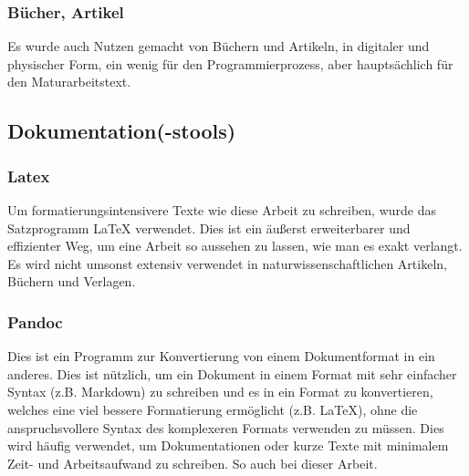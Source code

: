 \documentclass[a4paper,11pt]{article}
\begin{document}
\subsubsection{Bücher, Artikel}
Es wurde auch Nutzen gemacht von Büchern und Artikeln, in digitaler und physischer Form, ein wenig für den Programmierprozess, aber hauptsächlich für den Maturarbeitstext.

\subsection{Dokumentation(-stools)}
\subsubsection{Latex}
Um formatierungsintensivere Texte wie diese Arbeit zu schreiben, wurde das Satzprogramm LaTeX verwendet. Dies ist ein äußerst erweiterbarer und effizienter Weg, um eine Arbeit so aussehen zu lassen, wie man es exakt verlangt. Es wird nicht umsonst extensiv verwendet in naturwissenschaftlichen Artikeln, Büchern und Verlagen.
\subsubsection{Pandoc}
Dies ist ein Programm zur Konvertierung von einem Dokumentformat in ein anderes. Dies ist nützlich, um ein Dokument in einem Format mit sehr einfacher Syntax (z.B. Markdown) zu schreiben und es in ein Format zu konvertieren, welches eine viel bessere Formatierung ermöglicht (z.B. LaTeX), ohne die anspruchsvollere Syntax des komplexeren Formats verwenden zu müssen. Dies wird häufig verwendet, um Dokumentationen oder kurze Texte mit minimalem Zeit- und Arbeitsaufwand zu schreiben. So auch bei dieser Arbeit.
\end{document}
